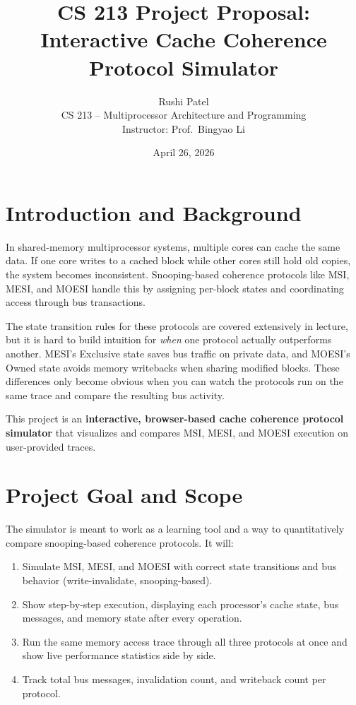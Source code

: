 \documentclass[11pt]{article}
\title{\vspace{-1.5cm}\textbf{CS 213 Project Proposal: Interactive Cache Coherence Protocol Simulator}\vspace{-0.3cm}}
\author{Rushi Patel \\ CS 213 -- Multiprocessor Architecture and Programming \\ Instructor: Prof.\ Bingyao Li}
\date{April 26, 2026}
\begin{document}
\maketitle

\section{Introduction and Background}

In shared-memory multiprocessor systems, multiple cores can cache the same data. If one core writes to a cached block while other cores still hold old copies, the system becomes inconsistent. Snooping-based coherence protocols like MSI, MESI, and MOESI handle this by assigning per-block states and coordinating access through bus transactions.

The state transition rules for these protocols are covered extensively in lecture, but it is hard to build intuition for \textit{when} one protocol actually outperforms another. MESI's Exclusive state saves bus traffic on private data, and MOESI's Owned state avoids memory writebacks when sharing modified blocks. These differences only become obvious when you can watch the protocols run on the same trace and compare the resulting bus activity.

This project is an \textbf{interactive, browser-based cache coherence protocol simulator} that visualizes and compares MSI, MESI, and MOESI execution on user-provided traces.

\section{Project Goal and Scope}

The simulator is meant to work as a learning tool and a way to quantitatively compare snooping-based coherence protocols. It will:

\begin{enumerate}[nosep]
    \item Simulate MSI, MESI, and MOESI with correct state transitions and bus behavior (write-invalidate, snooping-based).
    \item Show step-by-step execution, displaying each processor's cache state, bus messages, and memory state after every operation.
    \item Run the same memory access trace through all three protocols at once and show live performance statistics side by side.
    \item Track total bus messages, invalidation count, and writeback count per protocol.
\end{enumerate}
\end{document}
